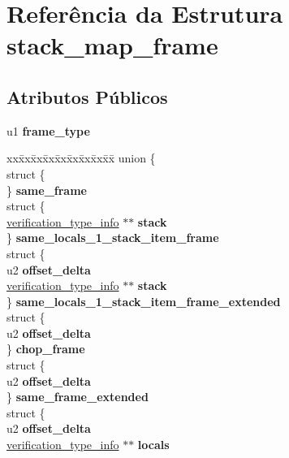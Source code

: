 \hypertarget{structstack__map__frame}{}\section{Referência da Estrutura stack\+\_\+map\+\_\+frame}
\label{structstack__map__frame}
\subsection*{Atributos Públicos}
\begin{DoxyCompactItemize}
\item 
\mbox{\label{structstack__map__frame_ae7d53e0f8daea6d5738a88ffb94e575c}} 
u1 {\bfseries frame\+\_\+type}
\item 
\mbox{\label{structstack__map__frame_aa924e6fab46f29a756e2649da800a419}} 
\begin{tabbing}
xx\=xx\=xx\=xx\=xx\=xx\=xx\=xx\=xx\=\kill
union \{\\
\>struct \{\\
\>\} {\bfseries same\_frame}\\
\>struct \{\\
\>\>\hyperlink{structverification__type__info}{verification\_type\_info} $\ast$$\ast$ {\bfseries stack}\\
\>\} {\bfseries same\_locals\_1\_stack\_item\_frame}\\
\>struct \{\\
\>\>u2 {\bfseries offset\_delta}\\
\>\>\hyperlink{structverification__type__info}{verification\_type\_info} $\ast$$\ast$ {\bfseries stack}\\
\>\} {\bfseries same\_locals\_1\_stack\_item\_frame\_extended}\\
\>struct \{\\
\>\>u2 {\bfseries offset\_delta}\\
\>\} {\bfseries chop\_frame}\\
\>struct \{\\
\>\>u2 {\bfseries offset\_delta}\\
\>\} {\bfseries same\_frame\_extended}\\
\>struct \{\\
\>\>u2 {\bfseries offset\_delta}\\
\>\>\hyperlink{structverification__type__info}{verification\_type\_info} $\ast$$\ast$ {\bfseries locals}\\
$$
\end{tabbing}
\end{DoxyCompactItemize}
